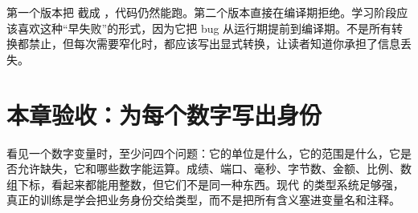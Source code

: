 第一个版本把  截成 ，代码仍然能跑。第二个版本直接在编译期拒绝。学习阶段应该喜欢这种“早失败”的形式，因为它把 bug 从运行期提前到编译期。不是所有转换都禁止，但每次需要窄化时，都应该写出显式转换，让读者知道你承担了信息丢失。

\section{本章验收：为每个数字写出身份}

看见一个数字变量时，至少问四个问题：它的单位是什么，它的范围是什么，它是否允许缺失，它和哪些数字能运算。成绩、端口、毫秒、字节数、金额、比例、数组下标，看起来都能用整数，但它们不是同一种东西。现代 \cpp 的类型系统足够强，真正的训练是学会把业务身份交给类型，而不是把所有含义塞进变量名和注释。
